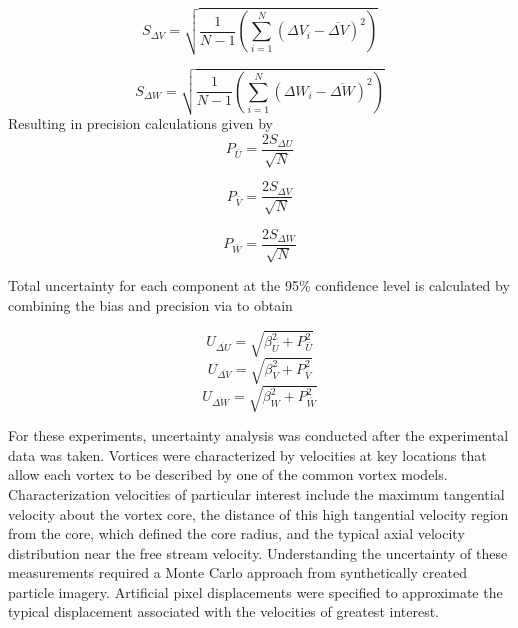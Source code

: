 \begin{equation}
S_{\Delta V} = \sqrt{\frac{1}{N-1} \left(\sum_{i=1}^N (\Delta V_i - 
	\overline{\Delta V})^2 \right)}
\label{eq:Vsd}
\end{equation}

\begin{equation}
S_{\Delta W} = \sqrt{\frac{1}{N-1} \left(\sum_{i=1}^N (\Delta W_i - 
	\overline{\Delta W})^2 \right)}
\label{eq:Wsd}
\end{equation}
%
Resulting in precision calculations given by 
%	
\begin{equation}
P_{\overline{U}} = \frac{2 S_{\Delta U}}{\sqrt{N}}
\label{eq:Uprec}
\end{equation}

\begin{equation}
P_{\overline{V}} = \frac{2 S_{\Delta V}}{\sqrt{N}}
\label{eq:Vprec}
\end{equation}

\begin{equation}
P_{\overline{W}} = \frac{2 S_{\Delta W}}{\sqrt{N}}
\label{eq:Wprec}
\end{equation}

Total uncertainty for each component at the 95\% confidence level is calculated 
by combining the bias and precision via to obtain

\begin{equation}
U_{\overline{\Delta U}} = \sqrt{\beta_{U}^2 + P_{\overline{U}}^2}
\label{eq:Uuncert}
\end{equation}
\begin{equation}
U_{\overline{\Delta V}} = \sqrt{\beta_{V}^2 + P_{\overline{V}}^2}
\label{eq:Vuncert}
\end{equation}
\begin{equation}
U_{\overline{\Delta W}} = \sqrt{\beta_{W}^2 + P_{\overline{W}}^2}
\label{eq:Wuncert}
\end{equation}


For these experiments, uncertainty analysis was conducted after the 
experimental data was taken. Vortices were characterized by velocities at key 
locations that allow each vortex to be described by one of the common vortex 
models. Characterization velocities of particular interest include the maximum 
tangential velocity about the vortex core, the distance of this high tangential 
velocity region from the core, which defined the core radius, and the typical 
axial velocity distribution near the free stream velocity. Understanding the 
uncertainty of these measurements required a Monte Carlo approach from 
synthetically created particle imagery. Artificial pixel displacements were 
specified to approximate the typical displacement associated with the 
velocities of greatest interest. 

